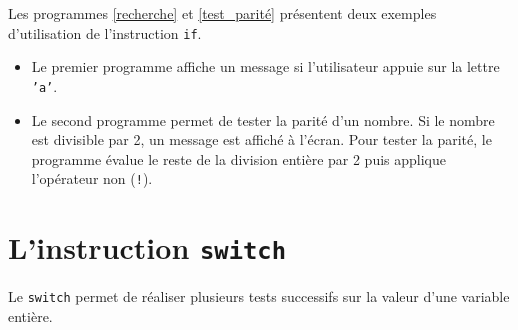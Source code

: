 \documentclass[a4paper,11pt]{book}
\theoremstyle{definition}
\begin{document}
Les programmes \ref{recherche} et \ref{test_parité} présentent deux exemples d'utilisation de
l'instruction \texttt{if}.
\begin{itemize}
\item Le premier programme affiche un message si l'utilisateur appuie sur la lettre \texttt{'a'}.
\item Le second programme permet de tester la parité d'un nombre. Si le nombre est
divisible par 2, un message est affiché à l'écran. Pour tester la
parité, le programme évalue le reste de la division entière par 2
puis applique l'opérateur non (\texttt{!}).
\end{itemize}





\clearpage

\section{L'instruction \texttt{switch}}
Le \texttt{switch} permet de réaliser plusieurs tests successifs sur la valeur d'une variable entière.
\end{document}
